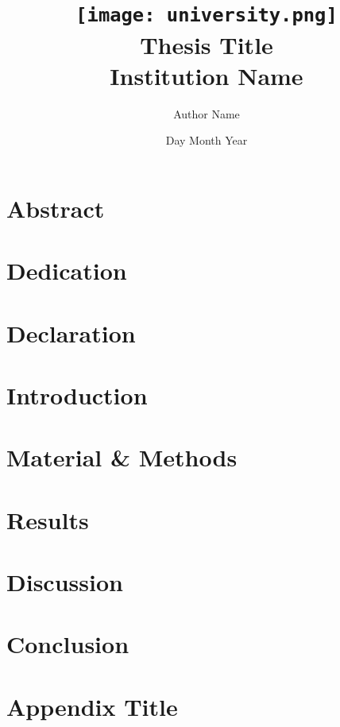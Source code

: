 \documentclass[12pt]{report} %
\title{
	{\texttt{[image: university.png]}}\\
	{Thesis Title}\\
	{\large Institution Name}\\
}
\author{Author Name}
\date{Day Month Year}
\begin{document}
\maketitle

\chapter{Abstract}


\chapter{Dedication}


\chapter{Declaration}


\tableofcontents
\listoffigures
\listoftables

\chapter{Introduction}


\chapter{Material \& Methods}


\chapter{Results}


\chapter{Discussion}


\chapter{Conclusion}


\printbibliography

\appendix
\chapter{Appendix Title}

\end{document}
